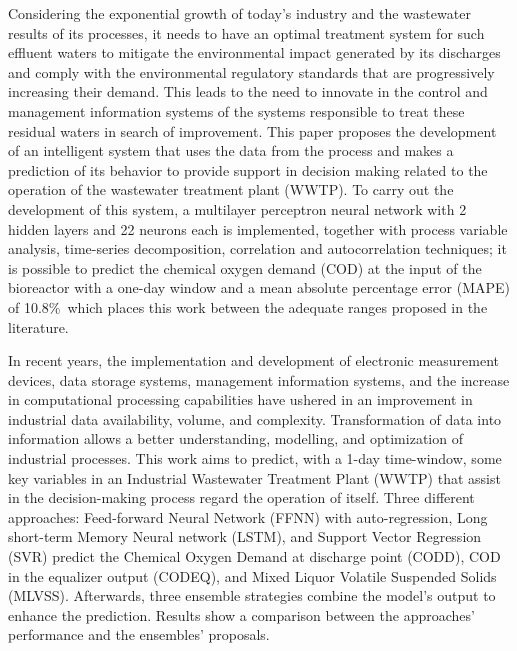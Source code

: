 Considering the exponential growth of today’s industry and the wastewater results of its processes, it needs to have an optimal treatment system for such effluent waters to mitigate the environmental impact generated by its discharges and comply with the environmental regulatory standards that are progressively increasing their demand. This leads to the need to innovate in the control and management information systems of the systems responsible to treat these residual waters in search of improvement. This paper proposes the development of an intelligent system that uses the data from the process and makes a prediction of its behavior to provide support in decision making related to the operation of the wastewater treatment plant (WWTP). To carry out the development of this system, a multilayer perceptron neural network with 2 hidden layers and 22 neurons each is implemented, together with process variable analysis, time-series decomposition, correlation and autocorrelation techniques; it is possible to predict the chemical oxygen demand (COD) at the input of the bioreactor with a one-day window and a mean absolute percentage error (MAPE) of 10.8\%\, which places this work between the adequate ranges proposed in the literature.
 
 In recent years, the implementation and development of electronic measurement devices, data storage systems, management information systems, and the increase in computational processing capabilities have ushered in an improvement in industrial data availability, volume, and complexity. Transformation of data into information allows a better understanding, modelling, and optimization of industrial processes. This work aims to predict, with a 1-day time-window, some key variables in an Industrial Wastewater Treatment Plant (WWTP) that assist in the decision-making process regard the operation of itself. Three different approaches: Feed-forward Neural Network (FFNN) with auto-regression, Long short-term Memory Neural network (LSTM), and Support Vector Regression (SVR) predict the Chemical Oxygen Demand at discharge point (CODD), COD in the equalizer output (CODEQ), and Mixed Liquor Volatile Suspended Solids (MLVSS). Afterwards, three ensemble strategies combine the model’s output to enhance the prediction. Results show a comparison between the approaches’ performance and the ensembles’ proposals.


